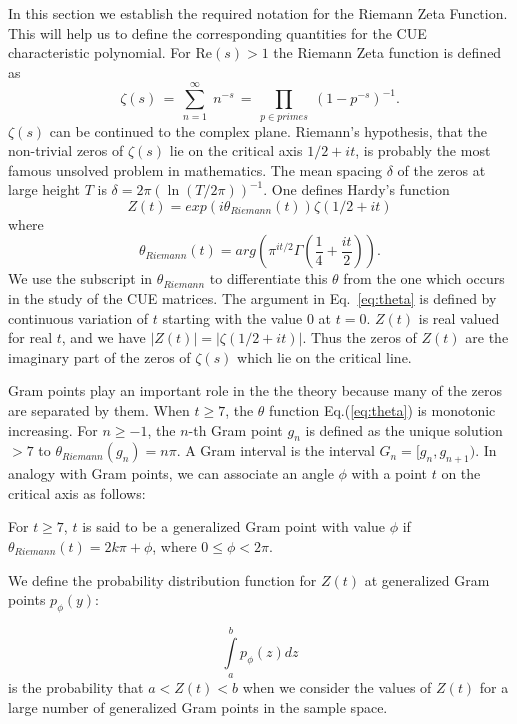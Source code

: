\documentclass[twoside]{article}
\begin{document}
In this section we  establish the required notation for the 
Riemann Zeta Function. This will help us to define the
corresponding quantities for the CUE characteristic polynomial.
For $\mathrm{Re} (s) > 1$ the Riemann Zeta function is defined as
\begin{equation}
\zeta ( s ) \, = \, \sum^{\infty}_{n = 1} \; n^{-s} \, = \, \prod_{p \in primes} \;
\left( 1 - p^{-s} \right)^{-1}.
\label{eqRie}
\end{equation}
 $\zeta ( s )$ can be continued to
the complex plane. Riemann's hypothesis, that the non-trivial zeros of $\zeta ( s )$ lie on the 
critical axis $1/2+it$, is probably the most famous unsolved problem in mathematics.
The mean spacing $\delta$ of the zeros  at large height $T$ is $\delta = 2\pi(\ln (T/2\pi))^{-1}$. 
One defines Hardy's function
\begin{equation}
Z(t)=exp(i\theta_{Riemann}(t))\zeta(1/2 +it) 
\label{eq:hardy}
\end{equation}
where 
\begin{equation}
\theta_{Riemann}(t) = arg (\pi^{it/2} \Gamma(\frac{1}{4} + \frac{it}{2})). 
\label{eq:theta}
\end{equation}
We use the subscript in $\theta_{Riemann}$ to differentiate this $\theta$ from the 
one which occurs in the study of the CUE matrices.
The argument in Eq.~\ref{eq:theta} is defined by continuous variation of $t$ 
starting with the value $0$ at $t = 0$.
$Z(t)$ is real valued for real $t$,
and we have $|Z(t)| = |\zeta(1/2+it)|$. Thus the zeros of $Z(t)$ are the 
imaginary part of the zeros 
of $\zeta(s)$ which lie on the critical line.  

Gram points play an important role in the the theory because many of the 
zeros are separated by them.  
When $t \ge 7$, the $\theta$ function Eq.(\ref{eq:theta}) is monotonic increasing. 
For $n \ge -1$, the $n$-th Gram point $g_n$ is defined as the unique solution $> 7$ to
$\theta_{Riemann} (g_n) = n\pi$. A Gram interval is the interval $G_n = [g_n,g_{n+1})$.
 In analogy with Gram points, we can associate an angle $\phi$ with a point $t$ on the 
 critical axis as follows:
\begin{definition}\label{phi}
For $t \ge 7$, $t$ is said to be a generalized Gram point with value $\phi$  if
$\theta_{Riemann} (t) = 2k\pi + \phi$, where $0 \le \phi < 2\pi$.
\end{definition}
We define the probability distribution function for $Z(t)$ at generalized Gram  points
 $p_{\phi}(y)$:
\begin{definition}\label{pphi}
\begin{equation}
\int\limits_{a}^{b} p_{\phi}(z)dz
\label{eq:pdfphi}
\end{equation}
is the probability that $a<Z(t)<b$ when we consider the values of $Z(t)$ 
for a large number of 
generalized Gram points in the sample space. 
\end{definition}
\end{document}
